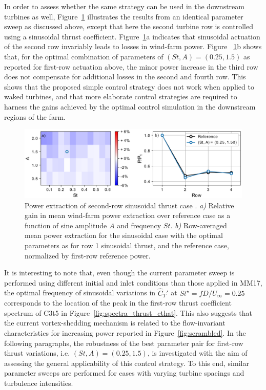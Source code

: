 \documentclass[wes, manuscript]{copernicus}
\newcommand{\cthat}{\widehat{C}_T'}
\begin{document}
In order to assess whether the same strategy can be used in the downstream turbines as well, Figure~\ref{fig:sinus_row2} illustrates the results from an identical parameter sweep as discussed above, except that here the second turbine row is controlled using a sinusoidal thrust coefficient. Figure~\ref{fig:sinus_row2}a indicates that sinusoidal actuation of the second row invariably leads to losses in wind-farm power. Figure ~\ref{fig:sinus_row2}b  shows that, for the optimal combination of parameters of  $(St, A) = (0.25, 1.5)$ as reported for first-row actuation above, the minor power increase in the third row does not compensate for additional losses in the second and fourth row. This shows that the proposed simple control strategy does not work when applied to waked turbines, and that more elaborate control strategies are required to harness the gains achieved by the optimal control simulation in the downstream regions of the farm. 
\begin{figure}
	\centering
	\includegraphics[width=\textwidth]{gains_row22.eps}
	\caption{Power extraction of second-row sinusoidal thrust case . \emph{a) } Relative gain in mean wind-farm power extraction over reference case as a function of sine amplitude $A$ and frequency $St$. \emph{b) } Row-averaged mean power extraction for the sinusoidal case with the optimal parameters as for row 1 sinusoidal thrust, and the reference case, normalized by first-row reference power.\label{fig:sinus_row2} }
\end{figure}

It is interesting to note that, even though the current parameter sweep is performed using different initial and inlet conditions than those applied in MM17, the optimal frequency of sinusoidal variations in $\cthat$ at $St^\star = f D / U_\infty = 0.25$ corresponds to the location of the peak in the first-row thrust coefficient spectrum of C3t5 in Figure~\ref{fig:spectra_thrust_cthat}. This also suggests that the current vortex-shedding mechanism is related to the flow-invariant characteristics for increasing power reported in Figure~\ref{fig:scrambled}. 
In the following paragraphs, the robustness of the best parameter pair for first-row thrust variations, i.e. $(St, A) = (0.25, 1.5)$, is investigated with the aim of assessing the general applicability of this control strategy. To this end, similar parameter sweeps are performed for cases with varying turbine spacings and turbulence intensities.
\end{document}
